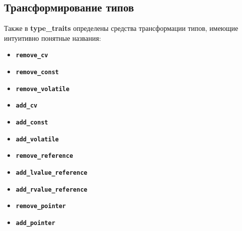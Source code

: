 \subsection{Трансформирование типов}
Также в \textbf{type\_traits} определены средства трансформации типов, имеющие интуитивно понятные названия:
\begin{itemize}
\item 	\texttt{\textbf{remove\_cv}}
\item	\texttt{\textbf{remove\_const}}
\item	\texttt{\textbf{remove\_volatile}}
\item	\texttt{\textbf{add\_cv}}
\item	\texttt{\textbf{add\_const}}
\item	\texttt{\textbf{add\_volatile}}
\item	\texttt{\textbf{remove\_reference}}
\item	\texttt{\textbf{add\_lvalue\_reference}}
\item	\texttt{\textbf{add\_rvalue\_reference}}
\item	\texttt{\textbf{remove\_pointer}}
\item	\texttt{\textbf{add\_pointer}}
\end{itemize}
